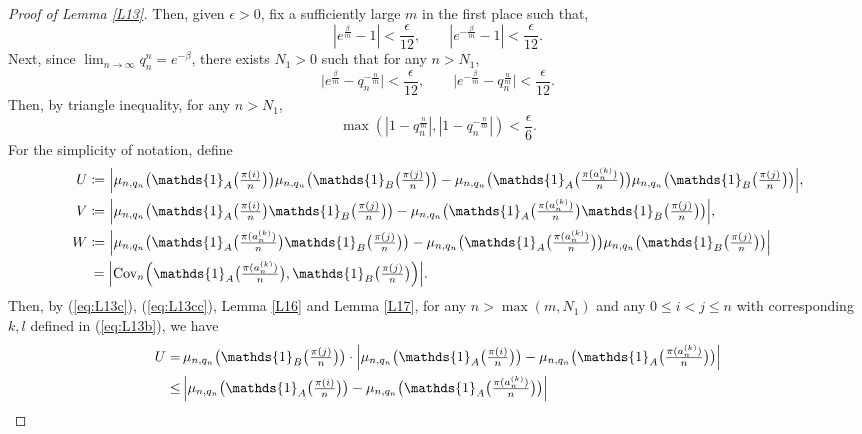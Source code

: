 \begin{proof}[Proof of Lemma \ref{L13}]
Then, given $\epsilon > 0$, fix a sufficiently large $m$ in the first place such that,
\[
\left|e^{\frac{\beta}{m}} - 1 \right| < \frac{\epsilon}{12}, \qquad
\left|e^{-\frac{\beta}{m}} - 1 \right| < \frac{\epsilon}{12}.
\]
Next, since $\lim_{n \to \infty} q_n^n = e^{-\beta}$, there exists $N_1> 0$ such that for any $n > N_1$,
\[
\Big|e^{\frac{\beta}{m}} - q_{n}^{- \frac{n}{m}} \Big| < \frac{\epsilon}{12}, \qquad
\Big|e^{-\frac{\beta}{m}} - q_{n}^{\frac{n}{m}} \Big| < \frac{\epsilon}{12}.
\]
Then, by triangle inequality, for any $n > N_1$,
\begin{equation}
\max{\left(\left|1-q_n^{\frac{n}{m}}\right|, \left|1-q_n^{-\frac{n}{m}}\right|\right)} < \frac{\epsilon}{6}. \label{eq:L13cc}
\end{equation}
For the simplicity of notation, define
\begin{align*}
U &\coloneqq \textstyle\Big|\n \big(\mathds{1}_A\big(\frac{\pi(i)}{n}\big)\big) \n \big(\mathds{1}_B\big(\frac{\pi(j)}{n}\big)\big) -
     \n \big(\mathds{1}_A\big(\frac{\pi(a_n^{(k)})}{n}\big)\big) \n \big(\mathds{1}_B\big(\frac{\pi(j)}{n}\big)\big) \Big|,\\
V &\coloneqq \textstyle\Big|\n \big(\mathds{1}_A\big(\frac{\pi(i)}{n}\big)\mathds{1}_B\big(\frac{\pi(j)}{n}\big)\big) -
   \n \big(\mathds{1}_A\big(\frac{\pi(a_n^{(k)})}{n}\big)\mathds{1}_B\big(\frac{\pi(j)}{n}\big)\big) \Big|,\\
W &\coloneqq \textstyle \Big| \n \big(\mathds{1}_A\big(\frac{\pi(a_n^{(k)})}{n}\big)\mathds{1}_B\big(\frac{\pi(j)}{n}\big)\big) -
     \n \big(\mathds{1}_A\big(\frac{\pi(a_n^{(k)})}{n}\big)\big) \n \big(\mathds{1}_B\big(\frac{\pi(j)}{n}\big)\big) \Big|\\
  &\,= \textstyle\Big|\cov_n\Big(\mathds{1}_A\big(\frac{\pi(a_n^{(k)})}{n}\big), \mathds{1}_B\big(\frac{\pi(j)}{n}\big)\Big)\Big|.
\end{align*}
Then, by (\ref{eq:L13c}), (\ref{eq:L13cc}), Lemma \ref{L16} and Lemma \ref{L17}, for any $n > \max{(m, N_1)}$ and any $0 \le i < j \le n$ with
corresponding $k, l$ defined in (\ref{eq:L13b}), we have
\begin{align*}
  U =&\, \textstyle\n \big(\mathds{1}_B\big(\frac{\pi(j)}{n}\big)\big) \cdot \Big| \n \big(\mathds{1}_A\big(\frac{\pi(i)}{n}\big)\big) -
   \n \big(\mathds{1}_A\big(\frac{\pi(a_n^{(k)})}{n}\big)\big)\Big|\\
 \le&\,\textstyle\Big| \n \big(\mathds{1}_A\big(\frac{\pi(i)}{n}\big)\big) - \n \big(\mathds{1}_A\big(\frac{\pi(a_n^{(k)})}{n}\big)\big)\Big|\\

\end{align*}
\end{proof}
